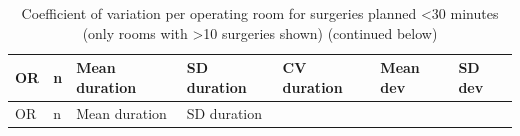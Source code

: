 \documentclass[
]{article}
\begin{document}
\begin{longtable}[]{@{}
  >{\centering\arraybackslash}p{}
  >{\centering\arraybackslash}p{}
  >{\centering\arraybackslash}p{}
  >{\centering\arraybackslash}p{}
  >{\centering\arraybackslash}p{}
  >{\centering\arraybackslash}p{}
  >{\centering\arraybackslash}p{}@{}}
\caption{Coefficient of variation per operating room for surgeries
planned \textless30 minutes (only rooms with \textgreater10 surgeries
shown) \label{tab:cv_room_lt30} (continued below)}\tabularnewline
\toprule\noalign{}
\begin{minipage}[b]{\linewidth}\centering
OR
\end{minipage} & \begin{minipage}[b]{\linewidth}\centering
n
\end{minipage} & \begin{minipage}[b]{\linewidth}\centering
Mean duration
\end{minipage} & \begin{minipage}[b]{\linewidth}\centering
SD duration
\end{minipage} & \begin{minipage}[b]{\linewidth}\centering
CV duration
\end{minipage} & \begin{minipage}[b]{\linewidth}\centering
Mean dev
\end{minipage} & \begin{minipage}[b]{\linewidth}\centering
SD dev
\end{minipage} \\
\midrule\noalign{}
\endfirsthead
\toprule\noalign{}
\begin{minipage}[b]{\linewidth}\centering
OR
\end{minipage} & \begin{minipage}[b]{\linewidth}\centering
n
\end{minipage} & \begin{minipage}[b]{\linewidth}\centering
Mean duration
\end{minipage} & \begin{minipage}[b]{\linewidth}\centering
SD duration
\end{minipage} & \begin{minipage}[b]{\linewidth}\centering

\end{minipage}
\end{longtable}
\end{document}
